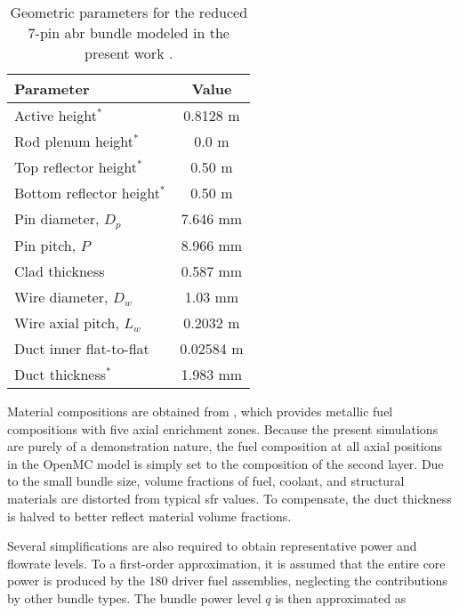 \documentclass[3p,,preprint,11pt]{elsarticle}
\begin{document}
\begin{table}[htb!]
\caption{Geometric parameters for the reduced 7-pin \gls{abr} bundle modeled in the present work \cite{abr}.}
\centering
\begin{tabular}{@{}lc@{}}
\toprule
Parameter & Value\\
\midrule
Active height$^*$ & 0.8128\phantom{0} \si{\meter}\phantom{m}\\
Rod plenum height$^*$ & 0.0\phantom{0000} \si{\meter}\phantom{m}\\
Top reflector height$^*$ & 0.50\phantom{000} \si{\meter}\phantom{m}\\
Bottom reflector height$^*$ & 0.50\phantom{000} \si{\meter}\phantom{m}\\
Pin diameter, $D_p$ & 7.646\phantom{00} \si{\milli\meter}\\
Pin pitch, $P$ & 8.966\phantom{00} \si{\milli\meter}\\
Clad thickness & 0.587\phantom{00} \si{\milli\meter}\\
Wire diameter, $D_w$ & 1.03\phantom{000} \si{\milli\meter}\\
Wire axial pitch, $L_w$ & 0.2032\phantom{0} \si{\meter}\phantom{m}\\
Duct inner flat-to-flat & 0.02584 \si{\meter}\phantom{m}\\
Duct thickness$^*$ & 1.983\phantom{00} \si{\milli\meter}\\
\bottomrule
\end{tabular}
\label{table:geom_abr}
\end{table}


Material compositions are obtained from \cite{abr_mats}, which provides metallic fuel compositions with five axial enrichment zones. 
Because the present simulations are purely of a demonstration nature, the fuel composition at all axial positions in the OpenMC model is simply set to the composition of the second layer. Due to the small bundle size, volume fractions of fuel, coolant, and structural materials are distorted from typical \gls{sfr} values. To compensate, the duct thickness is halved to better reflect material volume fractions.

Several simplifications are also required to obtain representative power and flowrate levels. To a first-order approximation, it is assumed that the entire core power is produced by the 180 driver fuel assemblies, neglecting the contributions by other bundle types. The bundle power level $q$ is then approximated as
\end{document}
